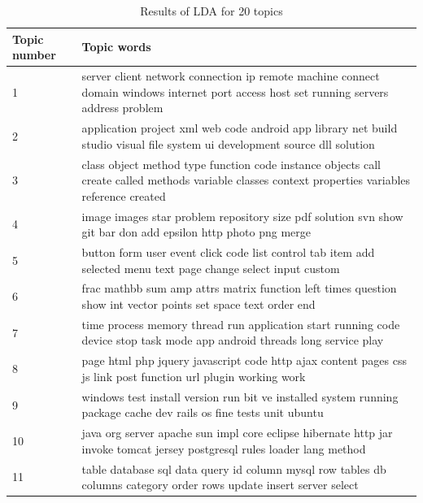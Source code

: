 \documentclass[conference]{IEEEtran}
\begin{document}
\begin{table}[!t]
\caption{Results of LDA for 20 topics}
\label{result2}
\centering
\begin{tabular}{ll}\hline
Topic number & Topic words                                                                                                                                        \\\hline
1            & server client network connection ip remote machine connect domain windows internet port access host set running servers address problem            \\
2            & application project xml web code android app library net build studio visual file system ui development source dll solution                        \\
3            & class object method type function code instance objects call create called methods variable classes context properties variables reference created \\
4            & image images star problem repository size pdf solution svn show git bar don add epsilon http photo png merge                                       \\
5            & button form user event click code list control tab item add selected menu text page change select input custom                                     \\
6            & frac mathbb sum amp attrs matrix function left times question show int vector points set space text order end                                      \\
7            & time process memory thread run application start running code device stop task mode app android threads long service play                          \\
8            & page html php jquery javascript code http ajax content pages css js link post function url plugin working work                                     \\
9            & windows test install version run bit ve installed system running package cache dev rails os fine tests unit ubuntu                                 \\
10           & java org server apache sun impl core eclipse hibernate http jar invoke tomcat jersey postgresql rules loader lang method                           \\
11           & table database sql data query id column mysql row tables db columns category order rows update insert server select                                \\

\end{tabular}
\end{table}
\end{document}
